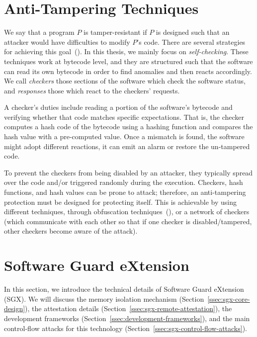 
\section{Anti-Tampering Techniques}
\label{sec:anti-tampering-techniques}

We say that a program $P$ is tamper-resistant if $P$ is designed such that an 
attacker would have difficulties to modify $P$'s code.
There are several strategies for achieving this 
goal~(\cite{nagra2009surreptitious}).
In this thesis, we mainly focus on \emph{self-checking}.
These techniques work at bytecode level, and they are structured such that the 
software can read its own bytecode in order to find anomalies and then reacts 
accordingly.
We call \emph{checkers} those sections of the software which check the software 
status, and \emph{responses} those which react to the checkers' requests.

A checker's duties include reading a portion of the software's bytecode and 
verifying whether that code matches specific expectations. That is, the checker 
computes a hash code of the bytecode using a hashing function and compares the 
hash value with a pre-computed value. 
Once a mismatch is found, the software might adopt different reactions, \eg it 
can emit an alarm or restore the un-tampered code. 

To prevent the checkers from being disabled by an attacker, they typically 
spread over the code and/or triggered randomly during the execution.
Checkers, hash functions, and hash values can be prone to attack; therefore, an 
anti-tampering protection must be designed for protecting itself.
This is achievable by using different techniques,
\eg through obfuscation techniques~(\cite{banescu2017tutorial}), or a network 
of checkers (which communicate with each other so that if one checker is 
disabled/tampered, other checkers become aware of the attack).

\section{Software Guard eXtension}
\label{sec:software-guard-extension}

In this section, we introduce the technical details of Software Guard 
eXtension (SGX). We will discuss the memory isolation mechanism 
(Section~\ref{ssec:sgx-core-design}), the attestation details 
(Section~\ref{ssec:sgx-remote-attestation}), the development frameworks 
(Section~\ref{ssec:development-frameworks}), and the main control-flow attacks 
for this technology (Section~\ref{ssec:sgx-control-flow-attacks}).

